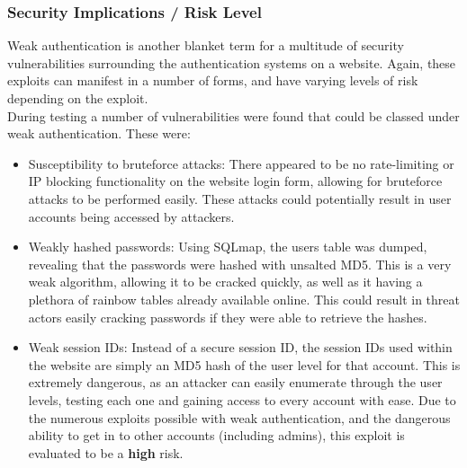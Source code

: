 \documentclass{report}
\begin{document}
\subsubsection{Security Implications / Risk Level}
Weak authentication is another blanket term for a multitude of security vulnerabilities surrounding the authentication systems on a website. Again, these exploits can manifest in a number of forms, and have varying levels of risk depending on the exploit.\\
During testing a number of vulnerabilities were found that could be classed under weak authentication. These were:
\begin{itemize}
	\item Susceptibility to bruteforce attacks: There appeared to be no rate-limiting or IP blocking functionality on the website login form, allowing for bruteforce attacks to be performed easily. These attacks could potentially result in user accounts being accessed by attackers.
	\item Weakly hashed passwords: Using SQLmap, the users table was dumped, revealing that the passwords were hashed with unsalted MD5. This is a very weak algorithm, allowing it to be cracked quickly, as well as it having a plethora of rainbow tables already available online. This could result in threat actors easily cracking passwords if they were able to retrieve the hashes.
	\item Weak session IDs: Instead of a secure session ID, the session IDs used within the website are simply an MD5 hash of the user level for that account. This is extremely dangerous, as an attacker can easily enumerate through the user levels, testing each one and gaining access to every account with ease.
Due to the numerous exploits possible with weak authentication, and the dangerous ability to get in to other accounts (including admins), this exploit is evaluated to be a \textbf{high} risk.
\end{itemize}
\end{document}
